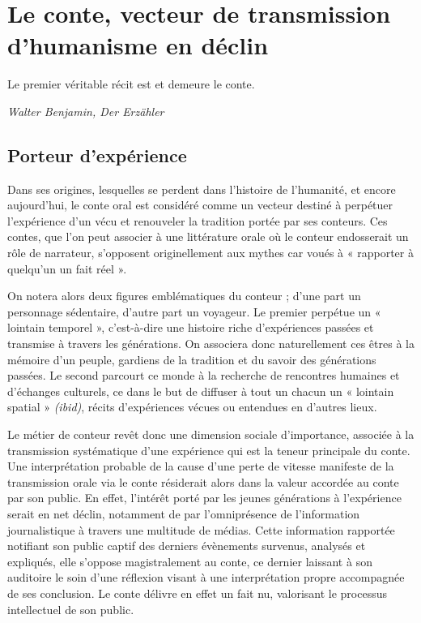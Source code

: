 \section{Le conte, vecteur de transmission d'humanisme en déclin}

\begin{shadequote}
Le premier véritable récit est et demeure le conte. \par\emph{Walter Benjamin, Der Erzähler}
\end{shadequote}


\subsection{Porteur d'expérience}
Dans ses origines, lesquelles se perdent dans l'histoire de l'humanité, et encore aujourd'hui, le conte oral est considéré comme un vecteur destiné à perpétuer l'expérience d'un vécu et renouveler la tradition portée par ses conteurs. Ces contes, que l'on peut associer à une littérature orale où le conteur endosserait un rôle de narrateur, s'opposent originellement aux mythes car voués à « rapporter à quelqu'un un fait réel »\cite{cnrtl}.

On notera alors deux figures emblématiques du conteur ; d'une part un personnage sédentaire, d'autre part un voyageur. Le premier perpétue un « lointain temporel »\cite{nouss2003conteur}, c'est-à-dire une histoire riche d'expériences passées et transmise à travers les générations. On associera donc naturellement ces êtres à la mémoire d'un peuple, gardiens de la tradition et du savoir des générations passées. Le second parcourt ce monde à la recherche de rencontres humaines et d'échanges culturels, ce dans le but de diffuser à tout un chacun un « lointain spatial » \textit{(ibid)}, récits d'expériences vécues ou entendues en d'autres lieux.

Le métier de conteur revêt donc une dimension sociale d'importance, associée à la transmission systématique d'une expérience qui est la teneur principale du conte. Une interprétation probable de la cause d'une perte de vitesse manifeste de la transmission orale via le conte résiderait alors dans la valeur accordée au conte par son public. En effet, l'intérêt porté par les jeunes générations à l'expérience serait en net déclin, notamment de par l'omniprésence de l'information journalistique à travers une multitude de médias. Cette information rapportée notifiant son public captif des derniers évènements survenus, analysés et expliqués, elle s'oppose magistralement au conte, ce dernier laissant à son auditoire le soin d'une réflexion visant à une interprétation propre accompagnée de ses conclusion. Le conte délivre en effet un fait nu, valorisant le processus intellectuel de son public.

